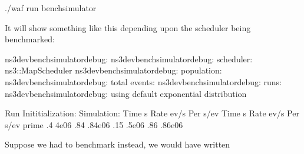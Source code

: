 \documentclass[letterpaper,10pt,english]{sphinxmanual}
\begin{document}
\begin{sphinxVerbatim}[commandchars=\\\{\}]
\PYGZdl{} ./waf \PYGZhy{}\PYGZhy{}run bench\PYGZhy{}simulator
\end{sphinxVerbatim}

It will show something like this depending upon the scheduler being benchmarked:

\begin{sphinxVerbatim}[commandchars=\\\{\}]
ns3\PYGZhy{}dev\PYGZhy{}bench\PYGZhy{}simulator\PYGZhy{}debug:
ns3\PYGZhy{}dev\PYGZhy{}bench\PYGZhy{}simulator\PYGZhy{}debug: scheduler: ns3::MapScheduler
ns3\PYGZhy{}dev\PYGZhy{}bench\PYGZhy{}simulator\PYGZhy{}debug: population: 
ns3\PYGZhy{}dev\PYGZhy{}bench\PYGZhy{}simulator\PYGZhy{}debug: total events: 
ns3\PYGZhy{}dev\PYGZhy{}bench\PYGZhy{}simulator\PYGZhy{}debug: runs: 
ns3\PYGZhy{}dev\PYGZhy{}bench\PYGZhy{}simulator\PYGZhy{}debug: using default exponential distribution

Run        Inititialization:                   Simulation:
            Time s    Rate ev/s Per s/ev  Time s    Rate ev/s Per s/ev
\PYGZhy{}\PYGZhy{}\PYGZhy{}\PYGZhy{}\PYGZhy{}\PYGZhy{}\PYGZhy{}\PYGZhy{}\PYGZhy{}\PYGZhy{}\PYGZhy{} \PYGZhy{}\PYGZhy{}\PYGZhy{}\PYGZhy{}\PYGZhy{}\PYGZhy{}\PYGZhy{}\PYGZhy{}\PYGZhy{}\PYGZhy{}\PYGZhy{} \PYGZhy{}\PYGZhy{}\PYGZhy{}\PYGZhy{}\PYGZhy{}\PYGZhy{}\PYGZhy{}\PYGZhy{}\PYGZhy{}\PYGZhy{}\PYGZhy{} \PYGZhy{}\PYGZhy{}\PYGZhy{}\PYGZhy{}\PYGZhy{}\PYGZhy{}\PYGZhy{}\PYGZhy{}\PYGZhy{}\PYGZhy{}\PYGZhy{} \PYGZhy{}\PYGZhy{}\PYGZhy{}\PYGZhy{}\PYGZhy{}\PYGZhy{}\PYGZhy{}\PYGZhy{}\PYGZhy{}\PYGZhy{}\PYGZhy{} \PYGZhy{}\PYGZhy{}\PYGZhy{}\PYGZhy{}\PYGZhy{}\PYGZhy{}\PYGZhy{}\PYGZhy{}\PYGZhy{}\PYGZhy{}\PYGZhy{} \PYGZhy{}\PYGZhy{}\PYGZhy{}\PYGZhy{}\PYGZhy{}\PYGZhy{}\PYGZhy{}\PYGZhy{}\PYGZhy{}\PYGZhy{}\PYGZhy{}
prime     .4               4e\PYGZhy{}06       .84              .84e\PYGZhy{}06
           .15              .5e\PYGZhy{}06     .86              .86e\PYGZhy{}06
\end{sphinxVerbatim}

Suppose we had to benchmark  instead, we would have written
\end{document}
